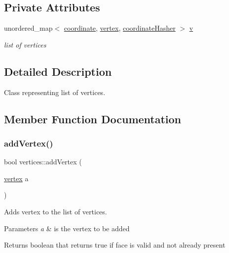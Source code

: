 \subsection*{Private Attributes}
\begin{DoxyCompactItemize}
\item 
unordered\+\_\+map$<$ \mbox{\hyperlink{structcoordinate}{coordinate}}, \mbox{\hyperlink{objects_8h_a220193f61d87fe6929bf42d2bac515a7}{vertex}}, \mbox{\hyperlink{structcoordinate_hasher}{coordinate\+Hasher}} $>$ \mbox{\hyperlink{classvertices_a0f41c20a63777890f588167e3158a2e5}{v}}
\begin{DoxyCompactList}\small\item\em list of vertices \end{DoxyCompactList}\end{DoxyCompactItemize}


\subsection{Detailed Description}
Class representing list of vertices. 

\subsection{Member Function Documentation}
\mbox{\label{classvertices_aef99918efeee8f6381db0c31d5af32b0}} 
\subsubsection{\texorpdfstring{add\+Vertex()}{addVertex()}\hspace{0.1cm}{\footnotesize\ttfamily [1/3]}}
{\footnotesize\ttfamily bool vertices\+::add\+Vertex (\begin{DoxyParamCaption}\item[{\mbox{\hyperlink{objects_8h_a220193f61d87fe6929bf42d2bac515a7}{vertex}}}]{a }\end{DoxyParamCaption})}



Adds vertex to the list of vertices. 


\begin{DoxyParams}{Parameters}
{\em a} & is the vertex to be added \\
\hline
\end{DoxyParams}
\begin{DoxyReturn}{Returns}
boolean that returns true if face is valid and not already present 
\end{DoxyReturn}
\mbox{\label{classvertices_a69b3a5c8963e6772fd0c36d0189665e8}} 
